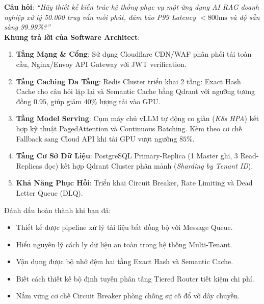 \begin{interviewbox}
\textbf{Câu hỏi}: \textit{``Hãy thiết kế kiến trúc hệ thống phục vụ một ứng dụng AI RAG doanh nghiệp xử lý 50.000 truy vấn mỗi phút, đảm bảo P99 Latency $< 800\text{ms}$ và độ sẵn sàng 99.99\%?''}\\
\textbf{Khung trả lời của Software Architect}:
\begin{enumerate}
  \item \textbf{Tầng Mạng \& Cổng}: Sử dụng Cloudflare CDN/WAF phân phối tải toàn cầu, Nginx/Envoy API Gateway với JWT verification.
  \item \textbf{Tầng Caching Đa Tầng}: Redis Cluster triển khai 2 tầng: Exact Hash Cache cho câu hỏi lặp lại và Semantic Cache bằng Qdrant với ngưỡng tương đồng $0.95$, giúp giảm $40\%$ lượng tải vào GPU.
  \item \textbf{Tầng Model Serving}: Cụm máy chủ vLLM tự động co giãn (\textit{K8s HPA}) kết hợp kỹ thuật PagedAttention và Continuous Batching. Kèm theo cơ chế Fallback sang Cloud API khi tải GPU vượt ngưỡng $85\%$.
  \item \textbf{Tầng Cơ Sở Dữ Liệu}: PostgreSQL Primary-Replica (1 Master ghi, 3 Read-Replicas đọc) kết hợp Qdrant Cluster phân mảnh (\textit{Sharding by Tenant ID}).
  \item \textbf{Khả Năng Phục Hồi}: Triển khai Circuit Breaker, Rate Limiting và Dead Letter Queue (DLQ).
\end{enumerate}
\end{interviewbox}

\begin{checkpointbox}
Đánh dấu hoàn thành khi bạn đã:
\begin{itemize}
  \item[$\square$] Thiết kế được pipeline xử lý tài liệu bất đồng bộ với Message Queue.
  \item[$\square$] Hiểu nguyên lý cách ly dữ liệu an toàn trong hệ thống Multi-Tenant.
  \item[$\square$] Vận dụng được bộ nhớ đệm hai tầng Exact Hash và Semantic Cache.
  \item[$\square$] Biết cách thiết kế bộ định tuyến phân tầng Tiered Router tiết kiệm chi phí.
  \item[$\square$] Nắm vững cơ chế Circuit Breaker phòng chống sự cố đổ vỡ dây chuyền.
\end{itemize}
\end{checkpointbox}
